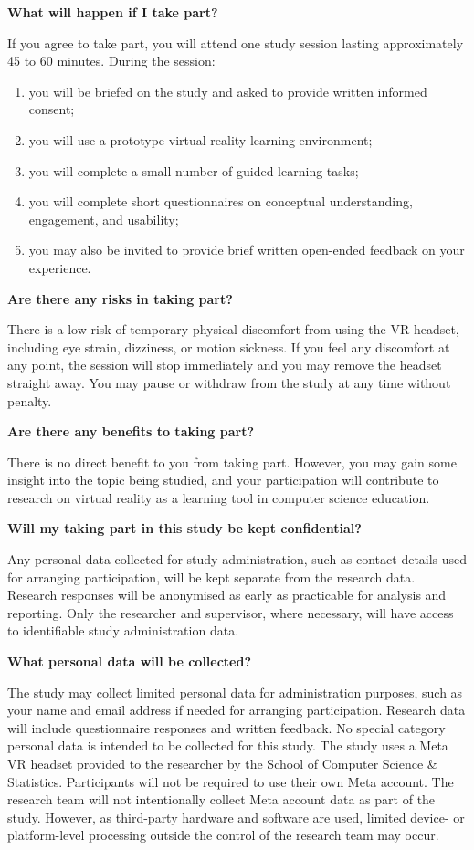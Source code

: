 \textbf{What will happen if I take part?}

If you agree to take part, you will attend one study session lasting approximately 45 to 60 minutes. During the session:

\begin{enumerate}
\item you will be briefed on the study and asked to provide written informed consent;
\item you will use a prototype virtual reality learning environment;
\item you will complete a small number of guided learning tasks;
\item you will complete short questionnaires on conceptual understanding, engagement, and usability;
\item you may also be invited to provide brief written open-ended feedback on your experience.
\end{enumerate}

\textbf{Are there any risks in taking part?}

There is a low risk of temporary physical discomfort from using the VR headset, including eye strain, dizziness, or motion sickness. If you feel any discomfort at any point, the session will stop immediately and you may remove the headset straight away. You may pause or withdraw from the study at any time without penalty.

\textbf{Are there any benefits to taking part?}

There is no direct benefit to you from taking part. However, you may gain some insight into the topic being studied, and your participation will contribute to research on virtual reality as a learning tool in computer science education.

\textbf{Will my taking part in this study be kept confidential?}

Any personal data collected for study administration, such as contact details used for arranging participation, will be kept separate from the research data. Research responses will be anonymised as early as practicable for analysis and reporting. Only the researcher and supervisor, where necessary, will have access to identifiable study administration data.

\textbf{What personal data will be collected?}

The study may collect limited personal data for administration purposes, such as your name and email address if needed for arranging participation. Research data will include questionnaire responses and written feedback. No special category personal data is intended to be collected for this study. The study uses a Meta VR headset provided to the researcher by the School of Computer Science \& Statistics. Participants will not be required to use their own Meta account. The research team will not intentionally collect Meta account data as part of the study. However, as third-party hardware and software are used, limited device- or platform-level processing outside the control of the research team may occur.

